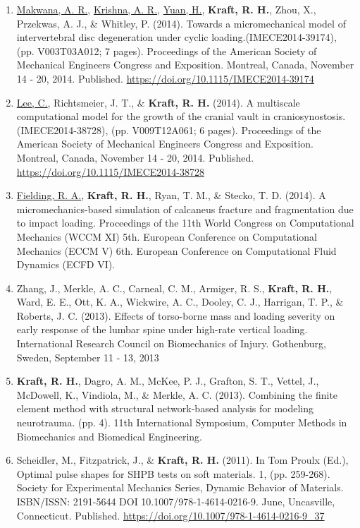 \documentclass[a4paper,10pt]{article}
\begin{document}
\begin{enumerate}
\item \underline{Makwana, A. R.}, \underline{Krishna, A. R.}, \underline{Yuan, H.}, \textbf{\textbf{Kraft,} R. H.}, Zhou, X., Przekwas, A. J., \& Whitley, P. (2014). Towards a micromechanical model of intervertebral disc degeneration under cyclic loading.(IMECE2014-39174), (pp. V003T03A012; 7 pages). Proceedings of the American Society of Mechanical Engineers Congress and Exposition.  Montreal, Canada, November 14 - 20, 2014. Published. \url{https://doi.org/10.1115/IMECE2014-39174}
\item \underline{Lee, C.}, Richtsmeier, J. T., \& \textbf{\textbf{Kraft,} R. H.} (2014). A multiscale computational model for the growth of the cranial vault in craniosynostosis.(IMECE2014-38728), (pp. V009T12A061; 6 pages). Proceedings of the American Society of Mechanical Engineers Congress and Exposition.  Montreal, Canada, November 14 - 20, 2014. Published. \url{https://doi.org/10.1115/IMECE2014-38728}
\item \underline{Fielding, R. A.}, \textbf{\textbf{Kraft,} R. H.}, Ryan, T. M., \& Stecko, T. D. (2014). A micromechanics-based simulation of calcaneus fracture and fragmentation due to impact loading. Proceedings of the 11th World Congress on Computational Mechanics (WCCM XI) 5th. European Conference on Computational Mechanics (ECCM V) 6th. European Conference on Computational Fluid Dynamics (ECFD VI).
\item Zhang, J., Merkle, A. C., Carneal, C. M., Armiger, R. S., \textbf{\textbf{Kraft,} R. H.}, Ward, E. E., Ott, K. A., Wickwire, A. C., Dooley, C. J., Harrigan, T. P., \& Roberts, J. C. (2013). Effects of torso-borne mass and loading severity on early response of the lumbar spine under high-rate vertical loading. International Research Council on Biomechanics of Injury. Gothenburg, Sweden, September 11 - 13, 2013
\item \textbf{\textbf{Kraft,} R. H.}, Dagro, A. M., McKee, P. J., Grafton, S. T., Vettel, J., McDowell, K., Vindiola, M., \& Merkle, A. C. (2013). Combining the finite element method with structural network-based analysis for modeling neurotrauma. (pp. 4). 11th International Symposium, Computer Methods in Biomechanics and Biomedical Engineering.
\item Scheidler, M., Fitzpatrick, J., \& \textbf{\textbf{Kraft,} R. H.} (2011). In Tom Proulx (Ed.), Optimal pulse shapes for SHPB tests on soft materials. 1, (pp. 259-268). Society for Experimental Mechanics Series, Dynamic Behavior of Materials.  ISBN/ISSN: 2191-5644 DOI 10.1007/978-1-4614-0216-9. June, Uncasville, Connecticut. Published. \url{https://doi.org/10.1007/978-1-4614-0216-9_37}

\end{enumerate}
\end{document}
